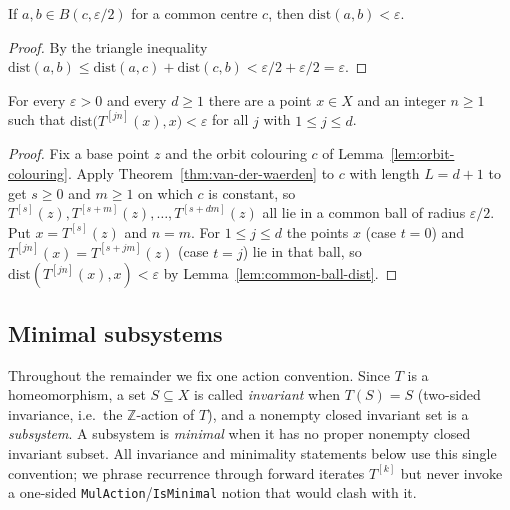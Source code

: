 \begin{lemma}
    \label{lem:common-ball-dist}
    \leanok
    If $a, b \in B(c, \varepsilon/2)$ for a common centre $c$, then
    $\mathrm{dist}(a, b) < \varepsilon$.
\end{lemma}
\begin{proof}
    By the triangle inequality
    $\mathrm{dist}(a, b) \le \mathrm{dist}(a, c) + \mathrm{dist}(c, b)
    < \varepsilon/2 + \varepsilon/2 = \varepsilon$.
\end{proof}

\begin{lemma}
    \label{lem:eps-multiple-recurrence}
    \leanok
    For every $\varepsilon > 0$ and every $d \ge 1$ there are a point $x \in X$
    and an integer $n \ge 1$ such that
    $\mathrm{dist}\bigl(T^{[j n]}(x), x\bigr) < \varepsilon$ for all $j$ with
    $1 \le j \le d$.
\end{lemma}
\begin{proof}
    Fix a base point $z$ and the orbit colouring $c$ of
    Lemma~\ref{lem:orbit-colouring}. Apply Theorem~\ref{thm:van-der-waerden} to
    $c$ with length $L = d + 1$ to get $s \ge 0$ and $m \ge 1$ on which $c$ is
    constant, so $T^{[s]}(z), T^{[s+m]}(z), \dots, T^{[s+dm]}(z)$ all lie in a
    common ball of radius $\varepsilon/2$. Put $x = T^{[s]}(z)$ and $n = m$. For
    $1 \le j \le d$ the points $x$ (case $t = 0$) and
    $T^{[j n]}(x) = T^{[s + j m]}(z)$ (case $t = j$) lie in that ball, so
    $\mathrm{dist}(T^{[j n]}(x), x) < \varepsilon$ by
    Lemma~\ref{lem:common-ball-dist}.
\end{proof}

\subsection{Minimal subsystems}

Throughout the remainder we fix one action convention. Since $T$ is a
homeomorphism, a set $S \subseteq X$ is called \emph{invariant} when
$T(S) = S$ (two-sided invariance, i.e.\ the $\mathbb{Z}$-action of $T$), and a
nonempty closed invariant set is a \emph{subsystem}. A subsystem is
\emph{minimal} when it has no proper nonempty closed invariant subset. All
invariance and minimality statements below use this single convention; we phrase
recurrence through forward iterates $T^{[k]}$ but never invoke a one-sided
\texttt{MulAction}/\texttt{IsMinimal} notion that would clash with it.

